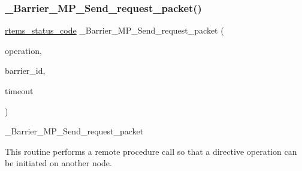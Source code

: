 \subsubsection{\texorpdfstring{\_Barrier\_MP\_Send\_request\_packet()}{\_Barrier\_MP\_Send\_request\_packet()}}
{\footnotesize\ttfamily \mbox{\hyperlink{group__ClassicStatus_ga545d41846817eaba6143d52ee4d9e9fe}{rtems\+\_\+status\+\_\+code}} \+\_\+\+Barrier\+\_\+\+M\+P\+\_\+\+Send\+\_\+request\+\_\+packet (\begin{DoxyParamCaption}\item[{\mbox{\hyperlink{group__ClassicBarrierMP_ga14a42806fd76d110a17d806124a892d0}{Barrier\+\_\+\+M\+P\+\_\+\+Remote\+\_\+operations}}}]{operation,  }\item[{\mbox{\hyperlink{group__RTEMSScoreObject_ga5821f52a51072941bdd603e542d0863e}{Objects\+\_\+\+Id}}}]{barrier\+\_\+id,  }\item[{\mbox{\hyperlink{group__ClassicTasks_gad39c43f949683d46874e3a5586b93aee}{rtems\+\_\+interval}}}]{timeout }\end{DoxyParamCaption})}



\+\_\+\+Barrier\+\_\+\+M\+P\+\_\+\+Send\+\_\+request\+\_\+packet 

This routine performs a remote procedure call so that a directive operation can be initiated on another node. 